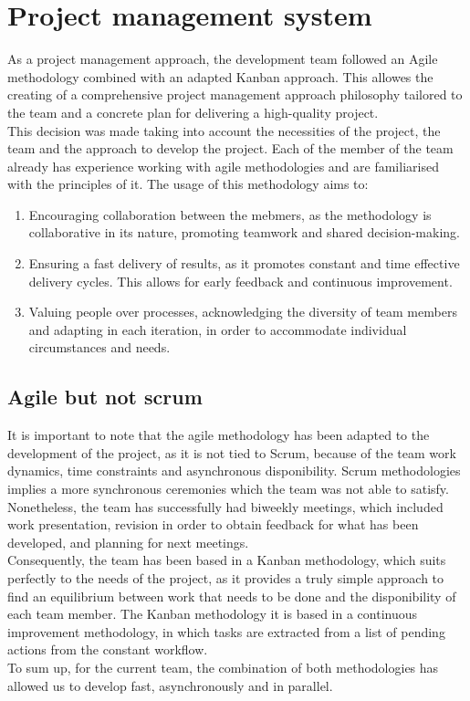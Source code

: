 \documentclass[../memory.tex]{subfiles}
\begin{document}
\section{Project management system}
As a project management approach, the development team followed an Agile
methodology combined with an adapted Kanban approach. This allowes the creating
of a comprehensive project management approach philosophy tailored to the team
and a concrete plan for delivering a high-quality project.
\\
This decision was made taking into account the necessities of the project, the
team and the approach to develop the project. Each of the member of the team
already has experience working with agile methodologies and are familiarised
with the principles of it. The usage of this methodology aims to:
\begin{enumerate}
	\item Encouraging collaboration between the mebmers, as the methodology is
	      collaborative in its nature, promoting teamwork and shared decision-making.
	\item Ensuring a fast delivery of results, as it promotes constant and time
	      effective delivery cycles. This allows for early feedback and continuous
	      improvement.
	\item Valuing people over processes, acknowledging the diversity of team
	      members and adapting in each iteration, in order to accommodate individual
	      circumstances and needs.
\end{enumerate}
\subsection{Agile but not scrum}
It is important to note that the agile methodology has been adapted to the
development of the project, as it is not tied to Scrum, because of the team work
dynamics, time constraints and asynchronous disponibility. Scrum methodologies
implies a more synchronous ceremonies which the team was not able to satisfy.
Nonetheless, the team has successfully had biweekly meetings, which included
work presentation, revision in order to obtain feedback for what has been
developed, and planning for next meetings.
\\[8pt]
Consequently, the team has been based in a Kanban methodology, which suits
perfectly to the needs of the project, as it provides a truly simple approach to
find an equilibrium between work that needs to be done and the disponibility of
each team member. The Kanban methodology it is based in a continuous improvement
methodology, in which tasks are extracted from a list of pending actions from
the constant workflow.
\\[8pt]
To sum up, for the current team, the combination of both methodologies has
allowed us to develop fast, asynchronously and in parallel.
\end{document}
